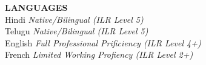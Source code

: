 \documentclass[a4paper, oneside]{article}
\begin{document}
\begin{flushleft}
{\large \textbf{LANGUAGES}} \\
\textbullet Hindi \textit{Native/Bilingual (ILR Level 5)} \\
\textbullet Telugu \textit{Native/Bilingual (ILR Level 5)} \\
\textbullet English \textit{Full Professional Prificiency (ILR Level 4+)} \\
\textbullet French \textit{Limited Working Profiency (ILR Level 2+)} \\

\end{flushleft}
\end{document}

